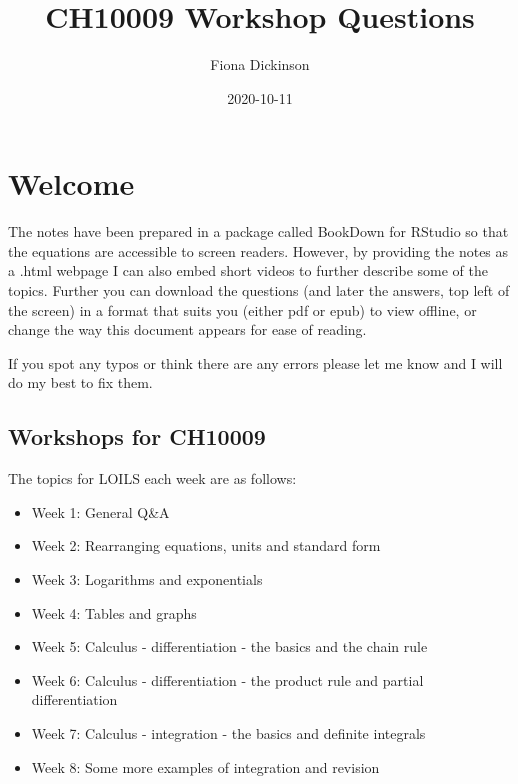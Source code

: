 \documentclass[
]{book}
\title{CH10009 Workshop Questions}
\author{Fiona Dickinson}
\date{2020-10-11}
\providecommand{\tightlist}{%
  \setlength{\itemsep}{0pt}\setlength{\parskip}{0pt}}
\begin{document}
\maketitle

{
\setcounter{tocdepth}{1}
\tableofcontents
}
\hypertarget{welcome}{%
\chapter*{Welcome}\label{welcome}}

The notes have been prepared in a package called BookDown for RStudio so that the equations are accessible to screen readers. However, by providing the notes as a .html webpage I can also embed short videos to further describe some of the topics. Further you can download the questions (and later the answers, top left of the screen) in a format that suits you (either pdf or epub) to view offline, or change the way this document appears for ease of reading.

If you spot any typos or think there are any errors please let me know and I will do my best to fix them.

\hypertarget{workshops-for-ch10009}{%
\section*{Workshops for CH10009}\label{workshops-for-ch10009}}

The topics for LOILS each week are as follows:

\begin{itemize}
\tightlist
\item
  Week 1: General Q\&A
\item
  Week 2: Rearranging equations, units and standard form
\item
  Week 3: Logarithms and exponentials
\item
  Week 4: Tables and graphs
\item
  Week 5: Calculus - differentiation - the basics and the chain rule
\item
  Week 6: Calculus - differentiation - the product rule and partial differentiation
\item
  Week 7: Calculus - integration - the basics and definite integrals
\item
  Week 8: Some more examples of integration and revision
\end{itemize}
\end{document}
